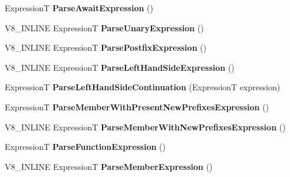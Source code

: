 \begin{DoxyCompactItemize}
ExpressionT {\bfseries Parse\+Await\+Expression} ()
\item 
\mbox{\label{classv8_1_1internal_1_1ParserBase_abc0745b7cf6ab64c56e5f97d2b7ff176}} 
V8\+\_\+\+I\+N\+L\+I\+NE ExpressionT {\bfseries Parse\+Unary\+Expression} ()
\item 
\mbox{\label{classv8_1_1internal_1_1ParserBase_a530563a2664fece09ba5978cd497b082}} 
V8\+\_\+\+I\+N\+L\+I\+NE ExpressionT {\bfseries Parse\+Postfix\+Expression} ()
\item 
\mbox{\label{classv8_1_1internal_1_1ParserBase_ac78ff126bb1c756c14de386f524cb67e}} 
V8\+\_\+\+I\+N\+L\+I\+NE ExpressionT {\bfseries Parse\+Left\+Hand\+Side\+Expression} ()
\item 
\mbox{\label{classv8_1_1internal_1_1ParserBase_a2d003a682f132bb99f175c55c5d1129c}} 
ExpressionT {\bfseries Parse\+Left\+Hand\+Side\+Continuation} (ExpressionT expression)
\item 
\mbox{\label{classv8_1_1internal_1_1ParserBase_a71f6ea7b9ae73dd9551b860d60a2dfda}} 
ExpressionT {\bfseries Parse\+Member\+With\+Present\+New\+Prefixes\+Expression} ()
\item 
\mbox{\label{classv8_1_1internal_1_1ParserBase_a4b6b12433bb955de114eb13ebefbdf0e}} 
V8\+\_\+\+I\+N\+L\+I\+NE ExpressionT {\bfseries Parse\+Member\+With\+New\+Prefixes\+Expression} ()
\item 
\mbox{\label{classv8_1_1internal_1_1ParserBase_a132ef2ee0d91ff4c449064d3c587f245}} 
ExpressionT {\bfseries Parse\+Function\+Expression} ()
\item 
\mbox{\label{classv8_1_1internal_1_1ParserBase_aefd8426cc76e6b176f0453d682bdf3e5}} 
V8\+\_\+\+I\+N\+L\+I\+NE ExpressionT {\bfseries Parse\+Member\+Expression} ()
\item 
\mbox{\label{classv8_1_1internal_1_1ParserBase_a4258378a4022a7ea5be6c8a63db1b369}} 

\end{DoxyCompactItemize}
